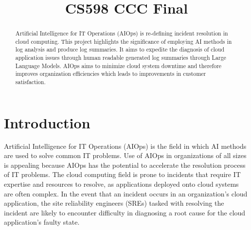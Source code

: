 \documentclass[conference]{IEEEtran}
\begin{document}
\title{CS598 CCC Final\\
}

\author{
\and
{}
\and
{}
}
\maketitle


\begin{abstract}
Artificial Intelligence for IT Operations (AIOps) is re-defining incident resolution in cloud computing. This project highlights the significance of employing AI methods in log analysis and produce log summaries. It aims to expedite the diagnosis of cloud application issues through human readable generated log summaries through Large Language Models. AIOps aims to minimize cloud system downtime and therefore improves organization efficiencies which leads to improvements in customer satisfaction.
\end{abstract}

\section{Introduction} \label{sec:introduction}

Artificial Intelligence for IT Operations (AIOps) is the field in which AI methods are used to solve common IT problems. Use of AIOps in organizations of all sizes is appealing because AIOps has the potential to accelerate the resolution process of IT problems. The cloud computing field is prone to incidents that require IT expertise and resources to resolve, as applications deployed onto cloud systems are often complex. In the event that an incident occurs in an organization's cloud application, the site reliability engineers (SREs) tasked with resolving the incident are likely to encounter difficulty in diagnosing a root cause for the cloud application's faulty state. \cite{chen2020aiops} \cite{mani2023enhancing}
\end{document}
